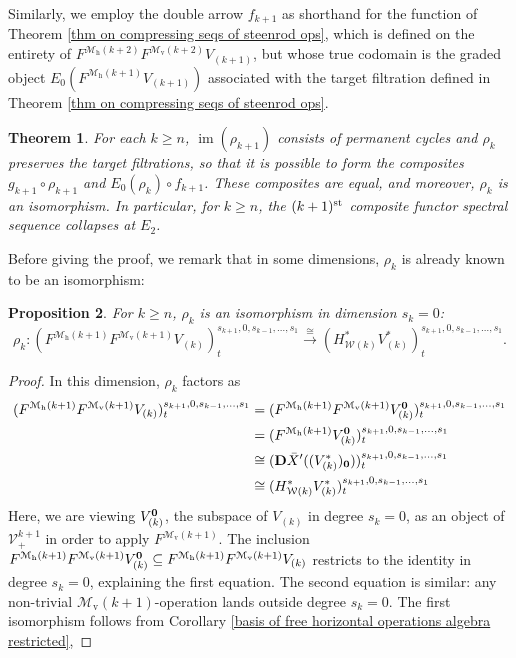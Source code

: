 \documentclass[11pt]{amsart} \renewcommand{\baselinestretch}{1.4}
\theoremstyle{plain}
\newtheorem{thm}{Theorem}[section]
\newtheorem{prop}[thm]{Proposition}
\theoremstyle{definition}
\DeclareMathOperator{\im}{im}
\renewcommand{\to}{\longrightarrow}
\newcommand{\calV}{\mathcal{V}}
\newcommand{\calw}{\mathcal{W}}
\newcommand{\calMv}{\mathcal{M}\dver}
\newcommand{\calMh}{\mathcal{M}\dhor}
\newcommand{\vect}[2]{\calV^{#1}_{#2}}
\newcommand{\UEAX}{\bar{X}'}%
\newcommand{\dver}{_\mathrm{v}}
\newcommand{\dhor}{_\mathrm{h}}
\newcommand{\dual}{\mathbf{D}}
\begin{document}
\begin{Calculations of HWn for n nonzero}
Similarly, we employ the double arrow $f_{k+1}$ as shorthand for the function of Theorem \ref{thm on compressing seqs of steenrod ops}, which is defined on the entirety of $F^{\calMh(k+2)}F^{\calMv(k+2)}V_{(k+1)}$, but whose true codomain is the graded object $E_0(F^{\calMh(k+1)}V_{(k+1)})$ associated with the target filtration defined in Theorem \ref{thm on compressing seqs of steenrod ops}.
\begin{thm}
\label{thm on collapsing of most sseqs}
For each $k\geq n$, $\im(\rho_{k+1})$ consists of permanent cycles and $\rho_k$ preserves the target filtrations, so that it is possible to form the composites $g_{k+1}\circ \rho_{k+1}$ and $E_0(\rho_{k})\circ f_{k+1}$. These composites are equal, and moreover, $\rho_k$ is an isomorphism. In particular, for $k\geq n$, the  $(k+1)^{\textup{st}}$ composite functor spectral sequence collapses at $E_2$.
\end{thm}
Before giving the proof, we remark that in some dimensions, $\rho_k$ is already known to be an isomorphism:
\begin{prop}
\label{isomorphism rho k in some dims}
For $k\geq n$, $\rho_k$ is an isomorphism in dimension $s_k=0$:
\[\rho_k:(F^{\calMh(k+1)}F^{\calMv(k+1)}V_{(k)})^{s_{k+1},0,s_{k-1},\ldots,s_1}_{t} \overset{\cong}{\to}(H^*_{\calw(k)}V^*_{(k)})^{s_{k+1},0,s_{k-1},\ldots,s_1}_{t}.\]
\end{prop}
\begin{proof}
In this dimension, $\rho_k$ factors as
\begin{alignat*}{2}
(F^{\calMh(k+1)}F^{\calMv(k+1)}V_{(k)})^{s_{k+1},0,s_{k-1},\ldots,s_1}_{t}
&=
(F^{\calMh(k+1)} F^{\calMv(k+1)}V_{(k)}^{\textbf{\textup{0}}})^{s_{k+1},0,s_{k-1},\ldots,s_1}_{t}\\
&=(F^{\calMh(k+1)}V_{(k)}^{\textbf{\textup{0}}})^{s_{k+1},0,s_{k-1},\ldots,s_1}_{t}\\
&\cong (\dual\UEAX((V^*_{(k)})_{\textbf{\textup{0}}}))^{s_{k+1},0,s_{k-1},\ldots,s_1}_{t}\\
&\cong (H^*_{\calw(k)}V^*_{(k)})^{s_{k+1},0,s_{k-1},\ldots,s_1}_{t}
\end{alignat*}
Here, we are viewing $V_{(k)}^{\textbf{\textup{0}}}$, the subspace of $V_{(k)}$ in degree $s_k=0$, as an object of $\vect{k+1}{+}$ in order to apply $F^{\calMv(k+1)}$. The inclusion $F^{\calMh(k+1)}F^{\calMv(k+1)}V_{(k)}^{\textbf{\textup{0}}}\subseteq F^{\calMh(k+1)}F^{\calMv(k+1)}V_{(k)}$ restricts to the identity in degree $s_k=0$, explaining the first equation. The second equation is similar: any non-trivial $\calMv(k+1)$-operation lands outside degree $s_k=0$. The first isomorphism follows from Corollary \ref{basis of free horizontal operations algebra restricted}, %

\end{proof}
\end{Calculations of HWn for n nonzero}
\end{document}
